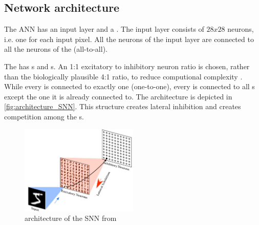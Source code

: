 \subsection{Network architecture}
\label{subsec:architecture}


The \ac{ANN} has an input layer and a \pLayer{} \cite{SNN}.
The input layer consists of $28 x 28$ neurons, i.e. one for each input pixel.
All the neurons of the input layer are connected to all the neurons of the \pLayer{} (all-to-all).

The \pLayer{} has \eN{}s and \iN{}s.
An 1:1 excitatory to inhibitory neuron ratio is chosen, rather than the biologically plausible 4:1 ratio, 
to reduce computional complexity \cite{SNN}.
While every \eN{} is connected to exactly one \iN{} (one-to-one), every \iN{} is connected to all \eN{}s except the one it is already connected to.
The architecture is depicted in \autoref{fig:architecture_SNN}.
This structure creates lateral inhibition and creates competition among the \eN{}s.

\begin{figure}[htbp]
    \center
    \includegraphics[width=0.5\textwidth]{pictures/architecture_SNN_erste_Quelle.jpg}
    \caption{architecture of the \ac{SNN} from \cite{SNN}}
    \label{fig:architecture_SNN}
\end{figure}
